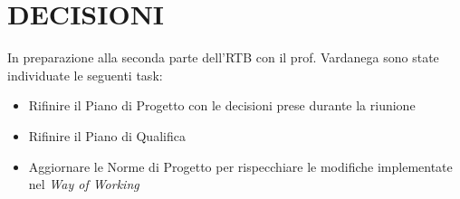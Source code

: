 \documentclass[5pt]{article}
\begin{document}
\section{DECISIONI}
In preparazione alla seconda parte dell'RTB con il prof. Vardanega sono state individuate le seguenti task:
\begin{itemize}
	\item Rifinire il Piano di Progetto con le decisioni prese durante la riunione
	\item Rifinire il Piano di Qualifica
	\item Aggiornare le Norme di Progetto per rispecchiare le modifiche implementate nel \textit{Way of Working}
\end{itemize}
\end{document}
